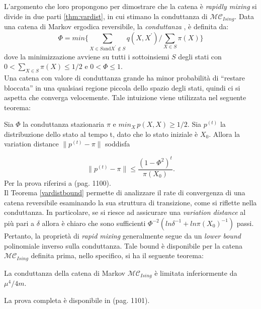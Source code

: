 L'argomento che loro propongono per dimostrare che la catena è \textit{rapidly mixing} si divide in due parti \ref{thm:vardist}, in cui stimano la conduttanza di $\mathcal{MC}_{Ising}$. Data una catena di Markov ergodica reversibile, la \textit{conduttanza} \cite{sinclair2012algorithms}, \cite{sinclair1989approximate} è definita da:
\begin{equation}
	\Phi = min \lbrace \sum_{X\in S \text{and} X^\prime \notin S}{q(X, X^\prime)/\sum_{X\in S}{\pi(X)}}\rbrace
	\label{conductance}
\end{equation}
dove la minimizzazione avviene su tutti i sottoinsiemi $S$ degli stati con $0 < \sum_{X\in S}{\pi(X)} \leq 1/2$ e $0 < \Phi \leq 1$.\\
Una catena con valore di conduttanza grande ha minor probabilità di ``restare bloccata'' in una qualsiasi regione piccola dello spazio degli stati, quindi ci si aspetta che converga velocemente. Tale intuizione viene utilizzata nel seguente teorema:
\begin{thm}
	\label{thm:vardist}
	Sia $\Phi$ la conduttanza stazionaria $\pi$ e $min_X\,p(X,X) \geq 1/2$. Sia $p^{(t)}$ la distribuzione dello stato al tempo t, dato che lo stato iniziale è $X_0$. Allora la variation distance $\|p^{(t)} - \pi\|$ soddisfa
\end{thm}
\begin{equation}
	\|p^{(t)} - \pi\| \leq \frac{(1 - \Phi^2)^t}{\pi(X_0)}.
	\label{vardistbound}
\end{equation}
Per la prova riferirsi a \cite{jerrum1993polynomial} (pag. 1100).\\
Il Teorema \ref{vardistbound} permette di analizzare il rate di convergenza di una catena reversibile esaminando la sua struttura di transizione, come si riflette nella conduttanza. In particolare, se si riesce ad assicurare una \textit{variation distance} al più pari a $\delta$ allora è chiaro che sono sufficienti $\Phi^{-2}(ln \delta^{-1} + ln \pi(X_0)^{-1})$ passi. Pertanto, la proprietà di \textit{rapid mixing} generalmente segue da un \textit{lower bound} polinomiale inverso sulla conduttanza. Tale bound è disponibile per la catena $\mathcal{MC}_{Ising}$ definita prima, nello specifico, si ha il seguente teorema:
\begin{thm}
	\label{thm:inflimcond}
	La conduttanza della catena di Markov $\mathcal{MC}_{Ising}$ è limitata inferiormente da $\mu^4/4m$.
\end{thm}
La prova completa è disponibile in \cite{jerrum1993polynomial} (pag. 1101).\\

